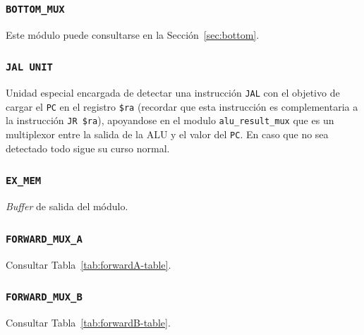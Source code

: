 \documentclass[a4paper]{article}
\begin{document}
\subsubsection{\texttt{BOTTOM\_MUX}} \label{subsubsection}
Este módulo puede consultarse en la Sección~\ref{sec:bottom}.

\subsubsection{\texttt{JAL UNIT}}
Unidad especial encargada de detectar una instrucción \texttt{JAL} con el objetivo de cargar el \texttt{PC} en el registro \texttt{\$ra} (recordar que esta instrucción es complementaria a la instrucción \texttt{JR \$ra}), apoyandose en el modulo \texttt{alu\_result\_mux} que es un multiplexor entre la salida de la ALU y el valor del \texttt{PC}. En caso que no sea detectado todo sigue su curso normal.

\subsubsection{\texttt{EX\_MEM}}
\textit{Buffer} de salida del módulo.

\subsubsection{\texttt{FORWARD\_MUX\_A}}
Consultar Tabla~\ref{tab:forwardA-table}.

\subsubsection{\texttt{FORWARD\_MUX\_B}}
Consultar Tabla~\ref{tab:forwardB-table}.
\end{document}
